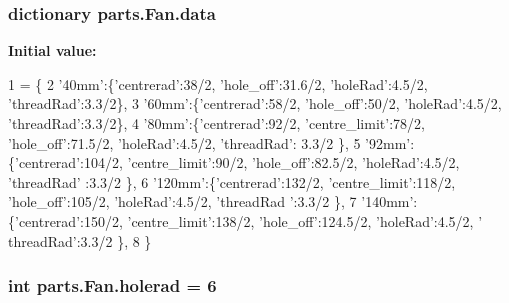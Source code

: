 \subsubsection[{data}]{\setlength{\rightskip}{0pt plus 5cm}dictionary parts.\+Fan.\+data\hspace{0.3cm}{\ttfamily [static]}}\label{classparts_1_1_fan_af88998014df582dab7a32bd3d94dc11f}
{\bfseries Initial value\+:}
\begin{DoxyCode}
1 = \{
2             \textcolor{stringliteral}{'40mm'}:\{\textcolor{stringliteral}{'centrerad'}:38/2,  \textcolor{stringliteral}{'hole\_off'}:31.6/2, \textcolor{stringliteral}{'holeRad'}:4.5/2, \textcolor{stringliteral}{'threadRad'}:3.3/2\},          
3             \textcolor{stringliteral}{'60mm'}:\{\textcolor{stringliteral}{'centrerad'}:58/2,  \textcolor{stringliteral}{'hole\_off'}:50/2, \textcolor{stringliteral}{'holeRad'}:4.5/2, \textcolor{stringliteral}{'threadRad'}:3.3/2\},
4             \textcolor{stringliteral}{'80mm'}:\{\textcolor{stringliteral}{'centrerad'}:92/2, \textcolor{stringliteral}{'centre\_limit'}:78/2, \textcolor{stringliteral}{'hole\_off'}:71.5/2, \textcolor{stringliteral}{'holeRad'}:4.5/2, \textcolor{stringliteral}{'threadRad'}:
      3.3/2 \},
5             \textcolor{stringliteral}{'92mm'}:\{\textcolor{stringliteral}{'centrerad'}:104/2, \textcolor{stringliteral}{'centre\_limit'}:90/2, \textcolor{stringliteral}{'hole\_off'}:82.5/2, \textcolor{stringliteral}{'holeRad'}:4.5/2, \textcolor{stringliteral}{'threadRad'}
      :3.3/2 \},
6             \textcolor{stringliteral}{'120mm'}:\{\textcolor{stringliteral}{'centrerad'}:132/2, \textcolor{stringliteral}{'centre\_limit'}:118/2, \textcolor{stringliteral}{'hole\_off'}:105/2, \textcolor{stringliteral}{'holeRad'}:4.5/2, \textcolor{stringliteral}{'threadRad
      '}:3.3/2 \},
7             \textcolor{stringliteral}{'140mm'}:\{\textcolor{stringliteral}{'centrerad'}:150/2, \textcolor{stringliteral}{'centre\_limit'}:138/2, \textcolor{stringliteral}{'hole\_off'}:124.5/2, \textcolor{stringliteral}{'holeRad'}:4.5/2, \textcolor{stringliteral}{'
      threadRad'}:3.3/2 \},
8             \}
\end{DoxyCode}
\hypertarget{classparts_1_1_fan_a8d712cc7fd8c31702b654a2cb8c19ecd}{}
\subsubsection[{holerad}]{\setlength{\rightskip}{0pt plus 5cm}int parts.\+Fan.\+holerad = 6\hspace{0.3cm}{\ttfamily [static]}}\label{classparts_1_1_fan_a8d712cc7fd8c31702b654a2cb8c19ecd}
\hypertarget{classparts_1_1_fan_a75666d4a0b6dd74f07fe5e84394aa116}{}
